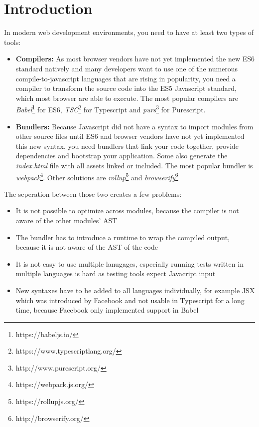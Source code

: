 \section{Introduction}

In modern web development environments, you need to have at least two types of tools:

\begin{itemize}

    \item{\textbf{Compilers:} As most browser vendors have not yet implemented the new ES6 standard natively and many developers want to use one of the numerous compile-to-javascript languages that are rising in popularity, you need a compiler to transform the source code into the ES5 Javascript standard, which most browser are able to execute. The most popular compilers are \textit{Babel}\footnote{https://babeljs.io/} for ES6, \textit{TSC}\footnote{https://www.typescriptlang.org/} for Typescript and \textit{purs}\footnote{http://www.purescript.org/} for Purescript.}

    \item{\textbf{Bundlers:} Because Javascript did not have a syntax to import modules from other source files until ES6 and browser vendors have not yet implemented this new syntax, you need bundlers that link your code together, provide dependencies and bootstrap your application. Some also generate the \textit{index.html} file with all assets linked or included. The most popular bundler is \textit{webpack}\footnote{https://webpack.js.org/}. Other solutions are \textit{rollup}\footnote{https://rollupjs.org/} and \textit{browserify}\footnote{http://browserify.org/}}

\end{itemize}

The seperation between those two creates a few problems:

\begin{itemize}
\item{It is not possible to optimize across modules, because the compiler is not aware of the other modules' AST}

\item{The bundler has to introduce a runtime to wrap the compiled output, because it is not aware of the AST of the code}

\item{It is not easy to use multiple lanugages, especially running tests written in multiple languages is hard as testing tools expect Javacript input}

\item{New syntaxes have to be added to all languages individually, for example JSX \cite{jsx} which was introduced by Facebook and not usable in Typescript for a long time, because Facebook only implemented support in Babel}

\end{itemize}

